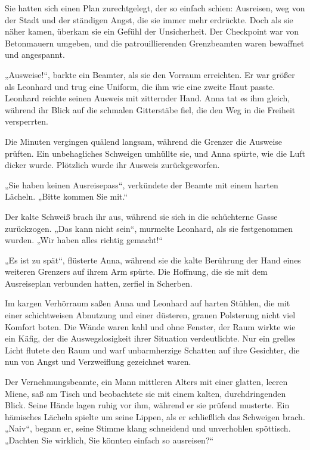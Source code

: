 \documentclass[
]{article}
\begin{document}
Sie hatten sich einen Plan zurechtgelegt, der so einfach schien:
Ausreisen, weg von der Stadt und der ständigen Angst, die sie immer mehr
erdrückte. Doch als sie näher kamen, überkam sie ein Gefühl der
Unsicherheit. Der Checkpoint war von Betonmauern umgeben, und die
patrouillierenden Grenzbeamten waren bewaffnet und angespannt.

„Ausweise!{\kern0pt}``, barkte ein Beamter, als sie den Vorraum
erreichten. Er war größer als Leonhard und trug eine Uniform, die ihm
wie eine zweite Haut passte. Leonhard reichte seinen Ausweis mit
zitternder Hand. Anna tat es ihm gleich, während ihr Blick auf die
schmalen Gitterstäbe fiel, die den Weg in die Freiheit versperrten.

Die Minuten vergingen quälend langsam, während die Grenzer die Ausweise
prüften. Ein unbehagliches Schweigen umhüllte sie, und Anna spürte, wie
die Luft dicker wurde. Plötzlich wurde ihr Ausweis zurückgeworfen.

„Sie haben keinen Ausreisepass``, verkündete der Beamte mit einem harten
Lächeln. „Bitte kommen Sie mit.``

Der kalte Schweiß brach ihr aus, während sie sich in die schüchterne
Gasse zurückzogen. „Das kann nicht sein``, murmelte Leonhard, als sie
festgenommen wurden. „Wir haben alles richtig gemacht!{\kern0pt}``

„Es ist zu spät``, flüsterte Anna, während sie die kalte Berührung der
Hand eines weiteren Grenzers auf ihrem Arm spürte. Die Hoffnung, die sie
mit dem Ausreiseplan verbunden hatten, zerfiel in Scherben.

Im kargen Verhörraum saßen Anna und Leonhard auf harten Stühlen, die mit
einer schichtweisen Abnutzung und einer düsteren, grauen Polsterung
nicht viel Komfort boten. Die Wände waren kahl und ohne Fenster, der
Raum wirkte wie ein Käfig, der die Auswegslosigkeit ihrer Situation
verdeutlichte. Nur ein grelles Licht flutete den Raum und warf
unbarmherzige Schatten auf ihre Gesichter, die nun von Angst und
Verzweiflung gezeichnet waren.

Der Vernehmungsbeamte, ein Mann mittleren Alters mit einer glatten,
leeren Miene, saß am Tisch und beobachtete sie mit einem kalten,
durchdringenden Blick. Seine Hände lagen ruhig vor ihm, während er sie
prüfend musterte. Ein hämisches Lächeln spielte um seine Lippen, als er
schließlich das Schweigen brach. „Naiv``, begann er, seine Stimme klang
schneidend und unverhohlen spöttisch. „Dachten Sie wirklich, Sie könnten
einfach so ausreisen?{\kern0pt}``
\end{document}
